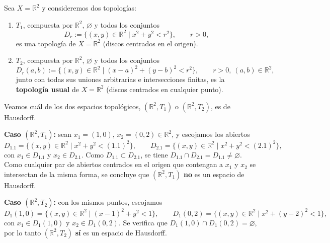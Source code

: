 \begin{ejemplo}
Sea $X=\mathbb{R}^2$ y consideremos dos topologías:
\begin{enumerate}[label=\alph*)]
\item $T_1$, compuesta por $\mathbb{R}^2$, $\varnothing$ y todos los
conjuntos
\[
D_r := \{(x,y)\in\mathbb{R}^2 \mid x^2+y^2 < r^2\}, \qquad r>0,
\]
es una topología de $X=\mathbb{R}^2$ (discos centrados en el origen).

\item $T_2$, compuesta por $\mathbb{R}^2$, $\varnothing$ y todos los
conjuntos
\[
D_r(a,b) := \{(x,y)\in\mathbb{R}^2 \mid (x-a)^2+(y-b)^2 < r^2\}, \qquad r>0,\
(a,b)\in\mathbb{R}^2,
\]
junto con todas sus uniones arbitrarias e intersecciones finitas, es la
\textbf{topología usual} de $X=\mathbb{R}^2$ (discos centrados en cualquier
punto).
\end{enumerate}

\begin{center}
\end{center}

Veamos cuál de los dos espacios topológicos, $(\mathbb{R}^2,T_1)$ o
$(\mathbb{R}^2,T_2)$, es de Hausdorff.

\medskip
\noindent\textbf{Caso $(\mathbb{R}^2,T_1)$:} sean $x_1=(1,0)$,
$x_2=(0,2)\in\mathbb{R}^2$, y escojamos los abiertos
\[
D_{1.1} = \{(x,y)\in\mathbb{R}^2 \mid x^2+y^2 < (1.1)^2\}, \qquad
D_{2.1} = \{(x,y)\in\mathbb{R}^2 \mid x^2+y^2 < (2.1)^2\},
\]
con $x_1\in D_{1.1}$ y $x_2\in D_{2.1}$. Como $D_{1.1}\subset D_{2.1}$,
se tiene $D_{1.1}\cap D_{2.1} = D_{1.1} \neq \varnothing$. Como cualquier
par de abiertos centrados en el origen que contengan a $x_1$ y $x_2$ se
intersectan de la misma forma, se concluye que $(\mathbb{R}^2,T_1)$
\textbf{no} es un espacio de Hausdorff.

\medskip
\noindent\textbf{Caso $(\mathbb{R}^2,T_2)$:} con los mismos puntos,
escojamos
\[
D_1(1,0) = \{(x,y)\in\mathbb{R}^2 \mid (x-1)^2+y^2<1\}, \qquad
D_1(0,2) = \{(x,y)\in\mathbb{R}^2 \mid x^2+(y-2)^2<1\},
\]
con $x_1\in D_1(1,0)$ y $x_2\in D_1(0,2)$. Se verifica que
$D_1(1,0)\cap D_1(0,2) = \varnothing$, por lo tanto $(\mathbb{R}^2,T_2)$
\textbf{sí} es un espacio de Hausdorff.
\end{ejemplo}

